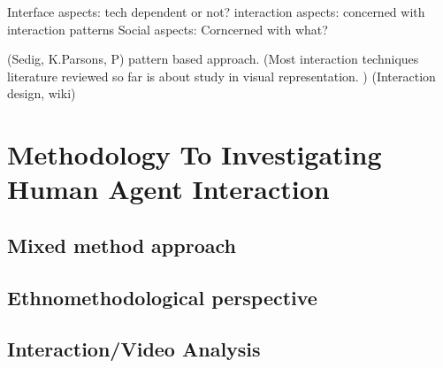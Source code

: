 Interface aspects: tech dependent or not?
interaction aspects: concerned with interaction patterns 
Social aspects: Corncerned with what? 

(Sedig, K.Parsons, P) pattern based approach.
(Most interaction techniques literature reviewed so far is about study in visual representation. )
(Interaction design, wiki)




\chapter{ Methodology To Investigating Human Agent Interaction}

\section{ Mixed method approach }

\section{ Ethnomethodological perspective }

\section{ Interaction/Video Analysis}



